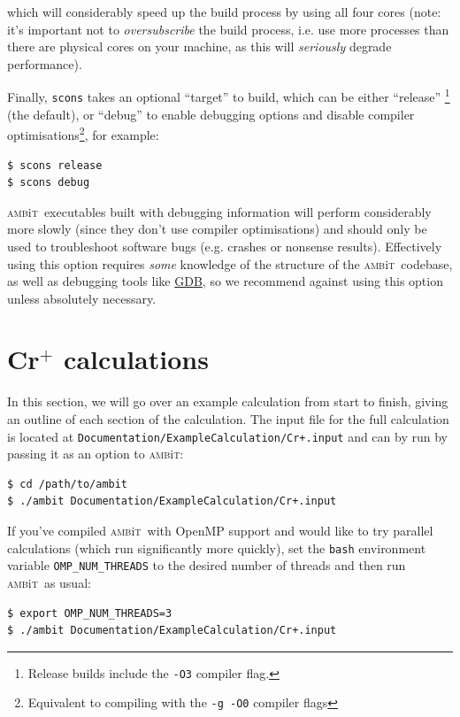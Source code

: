 \documentclass{report}
\newcommand{\ambit}{\textsc{amb}{\footnotesize i}\textsc{t}}
\begin{document}
which will considerably speed up the build process by using all four cores (note: it's important not to
\textit{oversubscribe} the build process, i.e. use more processes than there are physical cores on your 
machine, as this will \emph{seriously} degrade performance).

Finally, \texttt{scons} takes an optional ``target'' to build, which can be either ``release''%
\footnote{Release builds include the \texttt{-O3} compiler flag.} (the default), or ``debug'' to 
enable debugging options and disable compiler optimisations\footnote{Equivalent to compiling with the
\texttt{-g -O0} compiler flags}, for example:

\begin{verbatim}
$ scons release
$ scons debug
\end{verbatim}

\ambit\  executables built with debugging information will perform considerably more slowly (since they
don't use compiler optimisations) and should only be used to troubleshoot software bugs (e.g. crashes or
nonsense results). Effectively using this option requires \emph{some} knowledge of the structure of the
\ambit\  codebase, as well as debugging tools like \href{https://www.gnu.org/software/gdb/}{GDB}, so we
recommend against using this option unless absolutely necessary.

\section{Cr$^+$ calculations}

In this section, we will go over an example calculation from start to finish, giving an outline of each
section of the calculation. The input file for the full calculation is located at 
\texttt{Documentation/ExampleCalculation/Cr+.input} and can by run by passing it as an option to
\ambit:

\begin{verbatim}
$ cd /path/to/ambit
$ ./ambit Documentation/ExampleCalculation/Cr+.input
\end{verbatim}

If you've compiled \ambit\  with OpenMP support and would like to try parallel calculations (which run
significantly more quickly), set the \texttt{bash} environment variable \texttt{OMP\_NUM\_THREADS} to
the desired number of threads and then run \ambit\  as usual:

\begin{verbatim}
$ export OMP_NUM_THREADS=3
$ ./ambit Documentation/ExampleCalculation/Cr+.input
\end{verbatim}
\end{document}
